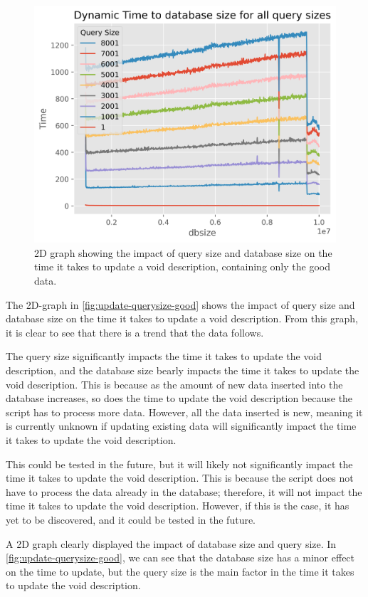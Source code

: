 \begin{figure}[htb!]
    \centering
    \includegraphics[width=0.8\columnwidth]{figures/dynamic-time-query-size-good.png}
    \caption{2D graph showing the impact of query size and database size on the time it takes to update a \gls{void} description, containing only the good data.}
    \label{fig:update-querysize-good}
\end{figure}


The 2D-graph in \autoref{fig:update-querysize-good} shows the impact of query size and database size on the time it takes to update a \gls{void} description. From this graph, it is clear to see that there is a trend that the data follows.

The query size significantly impacts the time it takes to update the \gls{void} description, and the database size bearly impacts the time it takes to update the \gls{void} description. This is because as the amount of new data inserted into the database increases, so does the time to update the \gls{void} description because the script has to process more data. However, all the data inserted is new, meaning it is currently unknown if updating existing data will significantly impact the time it takes to update the \gls{void} description.

This could be tested in the future, but it will likely not significantly impact the time it takes to update the \gls{void} description. This is because the script does not have to process the data already in the database; therefore, it will not impact the time it takes to update the \gls{void} description. However, if this is the case, it has yet to be discovered, and it could be tested in the future.

A 2D graph clearly displayed the impact of database size and query size. In \autoref{fig:update-querysize-good}, we can see that the database size has a minor effect on the time to update, but the query size is the main factor in the time it takes to update the \gls{void} description.


